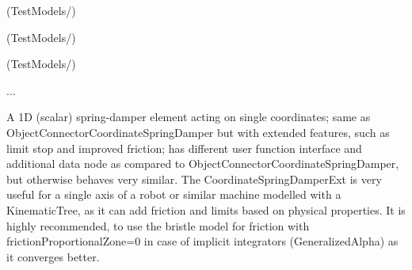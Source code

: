 \item {} (TestModels/)
\item {} (TestModels/)
\item {} (TestModels/)
\item  ...


\ei

%
\newpage


\label{sec:item:ObjectConnectorCoordinateSpringDamperExt}
A 1D (scalar) spring-damper element acting on single  coordinates; same as ObjectConnectorCoordinateSpringDamper but with extended features, such as limit stop and improved friction; has different user function interface and additional data node as compared to ObjectConnectorCoordinateSpringDamper, but otherwise behaves very similar. The CoordinateSpringDamperExt is very useful for a single axis of a robot or similar machine modelled with a KinematicTree, as it can add friction and limits based on physical properties. It is highly recommended, to use the bristle model for friction with frictionProportionalZone=0 in case of implicit integrators (GeneralizedAlpha) as it converges better.
\vspace{12pt}\\

